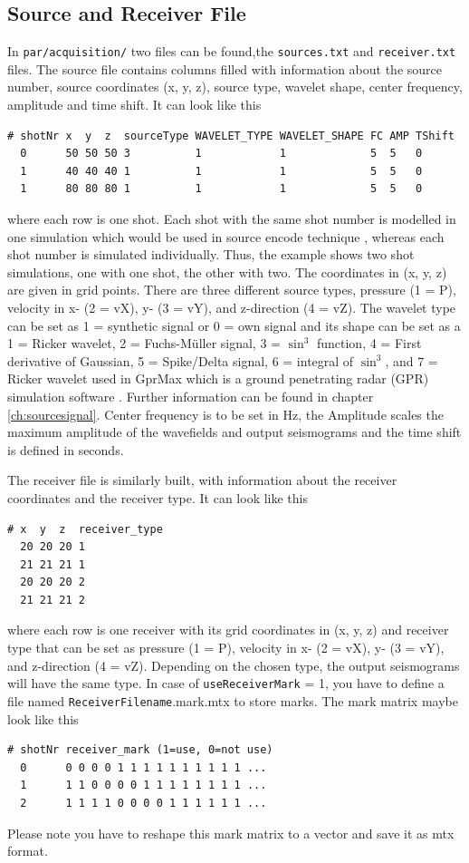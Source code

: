 \documentclass[pdftex,a4paper,parskip,listof=totoc,bibliography=totoc,onehalfspacing,12pt]{scrreprt}
\newcommand{\shellcmd}[1]{\indent\indent\texttt{#1}}	%
\begin{document}
\subsection{Source and Receiver File}\label{ch:sourcesandreceiver}
In \shellcmd{par/acquisition/} two files can be found,the \shellcmd{sources.txt} and \shellcmd{receiver.txt} files.
The source file contains columns filled with information about the source number, source coordinates (x, y, z), source type, wavelet shape, center frequency, amplitude and time shift. It can look like this
\begin{verbatim}
# shotNr x  y  z  sourceType WAVELET_TYPE WAVELET_SHAPE FC AMP TShift
  0      50 50 50 3          1            1             5  5   0
  1      40 40 40 1          1            1             5  5   0
  1      80 80 80 1          1            1             5  5   0
\end{verbatim}
where each row is one shot. Each shot with the same shot number is modelled in one simulation which would be used in source encode technique \citep{krebs2009fast}, whereas each shot number is simulated individually. Thus, the example shows two shot simulations, one with one shot, the other with two.
The coordinates in (x, y, z) are given in grid points. There are three different source types, pressure (1 = P), velocity in x- (2 = vX), y- (3 = vY), and z-direction (4 = vZ). 
The wavelet type can be set as 1 = synthetic signal or 0 = own signal and its shape can be set as a 1 = Ricker wavelet, 2 = Fuchs-M\"uller signal, 3 = $\sin^3$ function, 4 = First derivative of Gaussian, 5 = Spike/Delta signal, 6 = integral of $\sin^3$, and 7 = Ricker wavelet used in GprMax which is a ground penetrating radar (GPR) simulation software  \citep{giannopoulos2005modelling}. 
Further information can be found in chapter \ref{ch:sourcesignal}.
Center frequency is to be set in Hz, the Amplitude scales the maximum amplitude of the wavefields and output seismograms and the time shift is defined in seconds.

The receiver file is similarly built, with information about the receiver coordinates and the receiver type. It can look like this 
\begin{verbatim}
# x  y  z  receiver_type
  20 20 20 1
  21 21 21 1
  20 20 20 2
  21 21 21 2
\end{verbatim}
where each row is one receiver with its grid coordinates in (x, y, z) and receiver type that can be set as pressure (1 = P), velocity in x- (2 = vX), y- (3 = vY), and z-direction (4 = vZ). Depending on the chosen type, the output seismograms will have the same type. In case of \verb+useReceiverMark+ = 1, you have to define a file named \verb+ReceiverFilename+.mark.mtx to store marks. The mark matrix maybe look like this
\begin{verbatim}
# shotNr receiver_mark (1=use, 0=not use)
  0      0 0 0 0 1 1 1 1 1 1 1 1 1 1 ...
  1      1 1 0 0 0 0 1 1 1 1 1 1 1 1 ...
  2      1 1 1 1 0 0 0 0 1 1 1 1 1 1 ...
\end{verbatim}
Please note you have to reshape this mark matrix to a vector and save it as mtx format.
\end{document}
